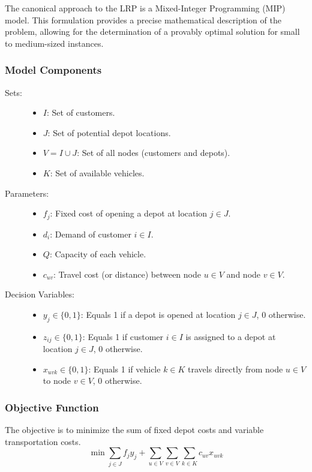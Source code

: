 \documentclass{article}
\begin{document}
The canonical approach to the LRP is a Mixed-Integer Programming (MIP) model. This formulation provides a precise mathematical description of the problem, allowing for the determination of a provably optimal solution for small to medium-sized instances.

\subsubsection{Model Components}

\begin{description}
    \item[Sets:]
    \begin{itemize}
        \item $I$: Set of customers.
        \item $J$: Set of potential depot locations.
        \item $V = I \cup J$: Set of all nodes (customers and depots).
        \item $K$: Set of available vehicles.
    \end{itemize}
    \item[Parameters:]
    \begin{itemize}
        \item $f_j$: Fixed cost of opening a depot at location $j \in J$.
        \item $d_i$: Demand of customer $i \in I$.
        \item $Q$: Capacity of each vehicle.
        \item $c_{uv}$: Travel cost (or distance) between node $u \in V$ and node $v \in V$.
    \end{itemize}
    \item[Decision Variables:]
    \begin{itemize}
        \item $y_j \in \{0, 1\}$: Equals 1 if a depot is opened at location $j \in J$, 0 otherwise.
        \item $z_{ij} \in \{0, 1\}$: Equals 1 if customer $i \in I$ is assigned to a depot at location $j \in J$, 0 otherwise.
        \item $x_{uvk} \in \{0, 1\}$: Equals 1 if vehicle $k \in K$ travels directly from node $u \in V$ to node $v \in V$, 0 otherwise.
    \end{itemize}
\end{description}

\subsubsection{Objective Function}
The objective is to minimize the sum of fixed depot costs and variable transportation costs.
\begin{equation}
\min \sum_{j \in J} f_j y_j + \sum_{u \in V} \sum_{v \in V} \sum_{k \in K} c_{uv} x_{uvk}
\end{equation}
\end{document}
